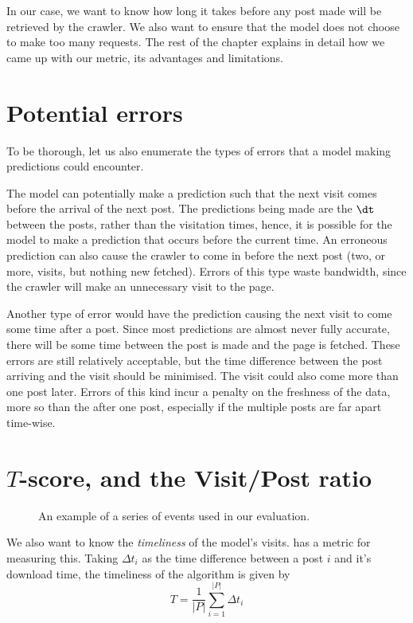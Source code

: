 In our case, we want to know how long it takes before any post made will be 
retrieved by the crawler. We also want to ensure that the model does not choose 
to make too many requests. The rest of the chapter explains in detail how we 
came up with our metric, its advantages and limitations.

\section{Potential errors}
To be thorough, let us also enumerate the types of errors that a model making 
predictions could encounter.

The model can potentially make a prediction such that the next visit comes 
before the arrival of the next post. The predictions being made are the $\dt$ 
between the posts, rather than the visitation times, hence, it is possible for 
the model to make a prediction that occurs before the current time. An erroneous 
prediction can also cause the crawler to come in before the next post (two, or 
more, visits, but nothing new fetched). Errors of this type waste bandwidth, 
since the crawler will make an unnecessary visit to the page.

Another type of error would have the prediction causing the next visit to come 
some time after a post. Since most predictions are almost never fully accurate, 
there will be some time between the post is made and the page is fetched. These 
errors are still relatively acceptable, but the time difference between the post 
arriving and the visit should be minimised. The visit could also come more than 
one post later. Errors of this kind incur a penalty on the freshness of the 
data, more so than the after one post, especially if the multiple posts are far 
apart time-wise.

\section{$T$-score, and the Visit/Post ratio}

\begin{figure}
	\begin{center}
	
	\caption{An example of a series of events used in our evaluation.}
	\end{center}
\end{figure}

We also want to know the \emph{timeliness} of the model's visits.  
 has a metric for measuring this. Taking $\Delta t_i$ as the 
time difference between a post $i$ and it's download time, the timeliness of the 
algorithm is given by
\[
	T = \frac{1}{|P|} \sum^{|P|}_{i=1}\Delta t_i
\]

